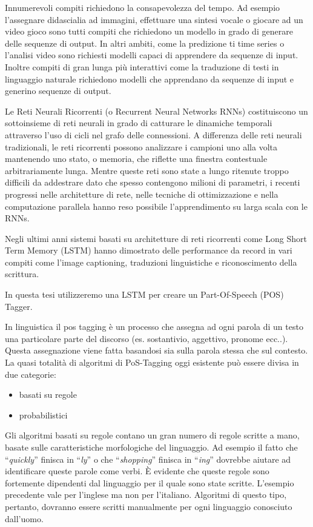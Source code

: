Innumerevoli compiti richiedono la consapevolezza del tempo.
Ad esempio l'assegnare didascialia ad immagini, effettuare una sintesi vocale o giocare ad un video gioco sono tutti compiti che richiedono un modello in grado di generare delle sequenze di output.
In altri ambiti, come la predizione ti time series o l'analisi video sono richiesti modelli capaci di apprendere da sequenze di input.
Inoltre compiti di gran lunga pi\`u interattivi come la traduzione di testi in linguaggio naturale richiedono modelli che apprendano da sequenze di input e generino sequenze di output.

Le Reti Neurali Ricorrenti (o Recurrent Neural Networks RNNs) costituiscono un sottoinsieme di reti neurali in grado di catturare le dinamiche temporali attraverso l'uso di cicli nel grafo delle connessioni.
A differenza delle reti neurali tradizionali, le reti ricorrenti possono analizzare i campioni uno alla volta mantenendo uno stato, o memoria, che riflette una finestra contestuale arbitrariamente lunga.
Mentre queste reti sono state a lungo ritenute troppo difficili da addestrare dato che spesso contengono milioni di parametri, i recenti progressi nelle architetture di rete, nelle tecniche di ottimizzazione e nella computazione parallela hanno reso possibile l'apprendimento su larga scala con le RNNs.

Negli ultimi anni sistemi basati su architetture di reti ricorrenti come Long Short Term Memory (LSTM) hanno dimostrato delle performance da record in vari compiti come l'image captioning, traduzioni linguistiche e riconoscimento della scrittura.

In questa tesi utilizzeremo una LSTM per creare un Part-Of-Speech (POS) Tagger.

In linguistica il pos tagging \`e un processo che assegna ad ogni parola di un testo una particolare parte del discorso (es. sostantivio, aggettivo, pronome ecc..).
Questa assegnazione viene fatta basandosi sia sulla parola stessa che sul contesto.
La quasi totalit\`a di algoritmi di PoS-Tagging oggi esistente pu\`o essere divisa in due categorie:

\begin{itemize}
  \item basati su regole
  \item probabilistici
\end{itemize}

Gli algoritmi basati su regole contano un gran numero di regole scritte a mano, basate sulle caratteristiche morfologiche del linguaggio.
Ad esempio il fatto che ``\emph{quickly}'' finisca in ``\emph{ly}'' o che ``\emph{shopping}'' finisca in ``\emph{ing}'' dovrebbe aiutare ad identificare queste parole come verbi.
\`E evidente che queste regole sono fortemente dipendenti dal linguaggio per il quale sono state scritte.
L'esempio precedente vale per l'inglese ma non per l'italiano. Algoritmi di questo tipo, pertanto, dovranno essere scritti manualmente per ogni linguaggio conosciuto dall'uomo.

